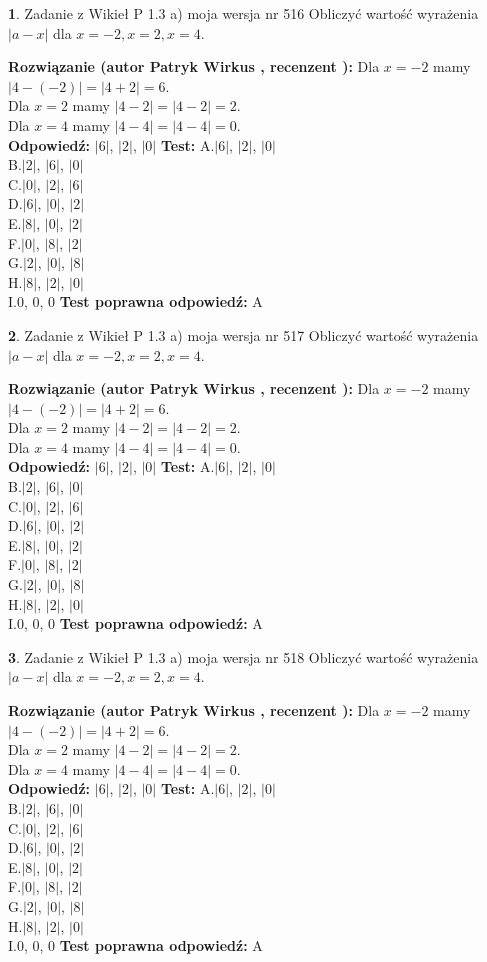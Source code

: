 \documentclass[12pt, a4paper]{article}
\theoremstyle{definition} %
\newtheorem{zad}{}
\newcommand{\zadStart}[1]{\begin{zad}#1\newline}
\newcommand{\zadStop}{\end{zad}}
\newcommand{\rozwStart}[2]{\noindent \textbf{Rozwiązanie (autor #1 , recenzent #2): }\newline}
\newcommand{\rozwStop}{\newline}
\newcommand{\odpStart}{\noindent \textbf{Odpowiedź:}\newline}
\newcommand{\odpStop}{\newline}
\newcommand{\testStart}{\noindent \textbf{Test:}\newline}
\newcommand{\testStop}{\newline}
\newcommand{\kluczStart}{\noindent \textbf{Test poprawna odpowiedź:}\newline}
\newcommand{\kluczStop}{\newline}
\begin{document}
\zadStart{Zadanie z Wikieł P 1.3 a) moja wersja nr 516}
Obliczyć wartość wyrażenia $|a - x|$ dla $x=-2,x=2,x=4$.
\zadStop
\rozwStart{Patryk Wirkus}{}
Dla $x = -2$ mamy $|4 - (-2)| = |4 + 2| = 6$.\\
Dla $x = 2$ mamy $|4 - 2| = |4 - 2| = 2$.\\
Dla $x = 4$ mamy $|4 - 4| = |4 - 4| = 0$.\\
\rozwStop
\odpStart
$|6|$, $|2|$, $|0|$
\odpStop
\testStart
A.$|6|$, $|2|$, $|0|$\\
B.$|2|$, $|6|$, $|0|$\\
C.$|0|$, $|2|$, $|6|$\\
D.$|6|$, $|0|$, $|2|$\\
E.$|8|$, $|0|$, $|2|$\\
F.$|0|$, $|8|$, $|2|$\\
G.$|2|$, $|0|$, $|8|$\\
H.$|8|$, $|2|$, $|0|$\\
I.$0$, $0$, $0$
\testStop
\kluczStart
A
\kluczStop



\zadStart{Zadanie z Wikieł P 1.3 a) moja wersja nr 517}
Obliczyć wartość wyrażenia $|a - x|$ dla $x=-2,x=2,x=4$.
\zadStop
\rozwStart{Patryk Wirkus}{}
Dla $x = -2$ mamy $|4 - (-2)| = |4 + 2| = 6$.\\
Dla $x = 2$ mamy $|4 - 2| = |4 - 2| = 2$.\\
Dla $x = 4$ mamy $|4 - 4| = |4 - 4| = 0$.\\
\rozwStop
\odpStart
$|6|$, $|2|$, $|0|$
\odpStop
\testStart
A.$|6|$, $|2|$, $|0|$\\
B.$|2|$, $|6|$, $|0|$\\
C.$|0|$, $|2|$, $|6|$\\
D.$|6|$, $|0|$, $|2|$\\
E.$|8|$, $|0|$, $|2|$\\
F.$|0|$, $|8|$, $|2|$\\
G.$|2|$, $|0|$, $|8|$\\
H.$|8|$, $|2|$, $|0|$\\
I.$0$, $0$, $0$
\testStop
\kluczStart
A
\kluczStop



\zadStart{Zadanie z Wikieł P 1.3 a) moja wersja nr 518}
Obliczyć wartość wyrażenia $|a - x|$ dla $x=-2,x=2,x=4$.
\zadStop
\rozwStart{Patryk Wirkus}{}
Dla $x = -2$ mamy $|4 - (-2)| = |4 + 2| = 6$.\\
Dla $x = 2$ mamy $|4 - 2| = |4 - 2| = 2$.\\
Dla $x = 4$ mamy $|4 - 4| = |4 - 4| = 0$.\\
\rozwStop
\odpStart
$|6|$, $|2|$, $|0|$
\odpStop
\testStart
A.$|6|$, $|2|$, $|0|$\\
B.$|2|$, $|6|$, $|0|$\\
C.$|0|$, $|2|$, $|6|$\\
D.$|6|$, $|0|$, $|2|$\\
E.$|8|$, $|0|$, $|2|$\\
F.$|0|$, $|8|$, $|2|$\\
G.$|2|$, $|0|$, $|8|$\\
H.$|8|$, $|2|$, $|0|$\\
I.$0$, $0$, $0$
\testStop
\kluczStart
A
\kluczStop
\end{document}
